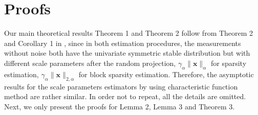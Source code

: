 \documentclass[journal,onecolumn]{IEEEtran}
\begin{document}
%


\appendices
\section{Proofs}

Our main theoretical results Theorem 1 and Theorem 2 follow from Theorem 2 and Corollary 1 in \cite{l2}, since in both estimation procedures, the measurements without noise both have the univariate symmetric stable distribution but with different scale parameters after the random projection, $\gamma_\alpha\lVert \mathbf{x}\rVert_{\alpha}$ for sparsity estimation, $\gamma_\alpha\lVert \mathbf{x}\rVert_{2,\alpha}$ for block sparsity estimation. Therefore, the asymptotic results for the scale parameters estimators by using characteristic function method are rather similar. In order not to repeat, all the details are omitted. Next, we only present the proofs for Lemma 2, Lemma 3 and Theorem 3. \\
\end{document}
